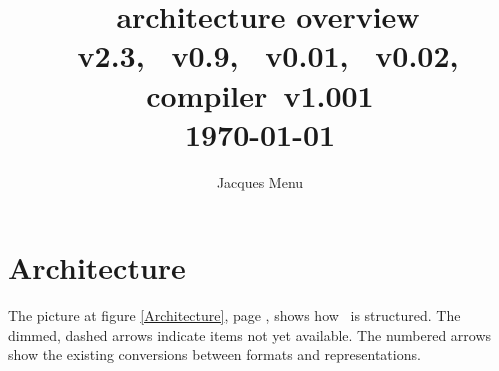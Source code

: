 \documentclass[12pt,a4paper]{article}
\begin{document}

\newcommand{\arrowIn}{
\tikz \draw[-stealth] (-2pt,0) -- (2pt,0);
}

\def \tab {~~~}



\title{
  \lib\ architecture overview \\[5pt]
  {\normalsize 
    \xmlToGuido\ v2.3, \xmlToLy\ v0.9, \xmlToBrl\ v0.01, \xmlToXml\ v0.02, \msdl compiler\ v1.001\\
    \today
  }
}

\author{
	Jacques Menu 
}

\date {}

\maketitle
\thispagestyle{fancy} %



\tableofcontents

\listoffigures


\section{Architecture}

The picture at figure \ref {Architecture}, page \pageref {Architecture}, shows how \lib\ is structured. The dimmed, dashed arrows indicate items not yet available. 
The numbered arrows show the existing conversions between formats and representations.
\end{document}
